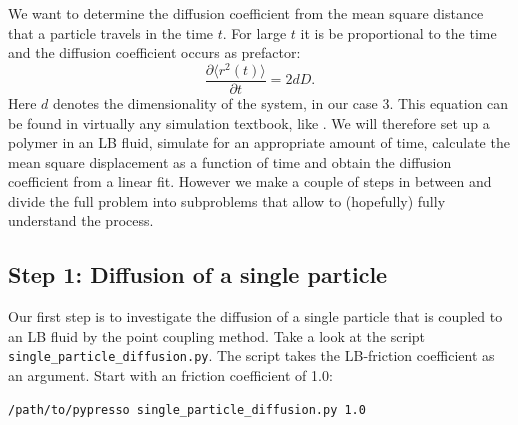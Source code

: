 We want to determine the diffusion coefficient from the mean square
distance that a particle travels in the time $t$. For large $t$ it is
be proportional to the time and the diffusion coefficient occurs as 
prefactor: 
\begin{equation}
  \frac{\partial \langle r^2 \left(t\right)\rangle}{\partial t} = 2 d D. 
  \label{eq:msd}
\end{equation}
Here $d$ denotes the dimensionality of the system, in our case 3.
This equation can be found in virtually any simulation textbook, like
\cite{frenkel02b}.
We will therefore set up a polymer in an LB fluid, simulate for an appropriate
amount of time, calculate the mean square displacement as a function of
time and obtain the diffusion coefficient from a linear fit. However
we make a couple of steps in between and divide the full problem into 
subproblems that allow to (hopefully) fully understand the process.

\subsection{Step 1: Diffusion of a single particle}
Our first step is to investigate the diffusion of a single particle
that is coupled to an LB fluid by the point coupling method.
Take a look at the script \texttt{single\_particle\_diffusion.py}.
The script takes the LB-friction coefficient as an argument. Start with
an friction coefficient of 1.0:
{\vspace{0,2cm}\small
\begin{lstlisting}[numbers=none]
/path/to/pypresso single_particle_diffusion.py 1.0
\end{lstlisting}
\vspace{0,2cm}
}


